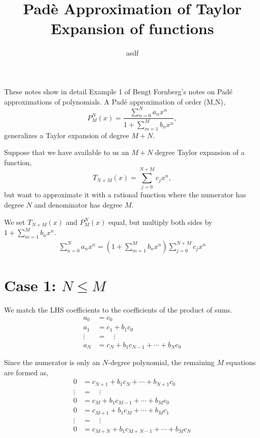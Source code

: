 \documentclass{article}
\title{Pad\`{e} Approximation of Taylor Expansion of functions}
\author{asdf}
\theoremstyle{definition}
\begin{document}
\maketitle
These notes show in detail Example 1 of Bengt Fornberg's notes on Pad\'{e} approximations of polynomials.
A Pad\'{e} approximation of order (M,N),
\begin{equation}
P_M^N(x) = \frac{\sum_{n=0}^N a_nx^n}{1+\sum_{m=1}^M b_nx^n},
\end{equation}
generalizes a Taylor expansion of degree $M+N$.

Suppose that we have available to us an $M+N$ degree Taylor expansion of a function, 
\begin{equation}
T_{N+M}(x) = \sum_{j=0}^{N+M}c_jx^n,
\end{equation}
but want to approximate it with a rational function where the numerator has degree $N$ and denominator has degree $M$.

We set $T_{N+M}(x)$ and $P_M^N(x)$ equal, but multiply both sides by $1+\sum_{m=1}^M b_nx^n$.
\begin{align}
\sum_{n=0}^N a_nx^n = \left(1+\sum_{m=1}^M b_nx^n\right) \sum_{j=0}^{N+M}c_jx^n
\end{align}
\section{Case 1: $N\leq M$}
We match the LHS coefficients to the coefficients of the product of sums.
\begin{align*}
a_0 &= c_0\\
a_1 &= c_1 + b_1c_0\\
\vdots &= \quad\vdots\\
a_N &=c_N + b_1c_{N-1} + \cdots + b_Nc_0
\end{align*}

Since the numerator is only an $N$-degree polynomial, the remaining  $M$ equations are formed as,
\begin{align*}
0 &= c_{N+1} + b_1 c_{N} + \cdots + b_{N+1} c_0\\
\vdots &= \quad\vdots\\
0 &= c_{M} + b_1 c_{M-1} + \cdots + b_{M}c_0\\
0 &= c_{M+1} + b_1 c_{M} + \cdots + b_{M}c_1\\
\vdots &= \quad\vdots\\
0 &= c_{M+N} + b_1 c_{M+N-1} + \cdots + b_{M}c_N
\end{align*}
\end{document}
